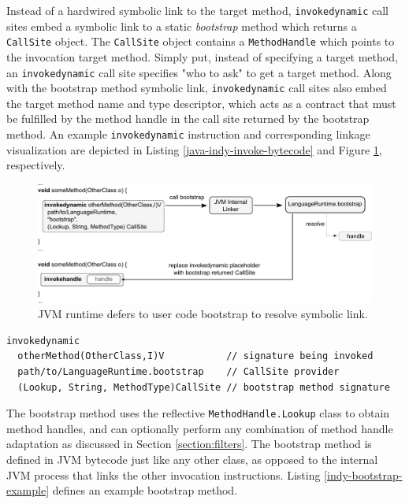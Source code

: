 Instead of a hardwired symbolic link to the target method, \texttt{invokedynamic} call sites embed a symbolic link to a static \emph{bootstrap} method which returns a \texttt{CallSite} object.  The \texttt{CallSite} object contains a \texttt{MethodHandle} which points to the invocation target method.  Simply put, instead of specifying a target method, an \texttt{invokedynamic} call site specifies "who to ask" to get a target method.  Along with the bootstrap method symbolic link, \texttt{invokedynamic} call sites also embed the target method name and type descriptor, which acts as a contract that must be fulfilled by the method handle in the call site returned by the bootstrap method.  An example \texttt{invokedynamic} instruction and corresponding linkage visualization are depicted in Listing \ref{java-indy-invoke-bytecode} and Figure \ref{fig:linking-invokedynamic}, respectively.
\vspace{2em}
\begin{figure}[htbp]
	\centering
    \includegraphics[width=\textwidth]{./Figures/linking-indy-bootstrap.pdf}
	\caption[invokedynamic Linking]{JVM runtime defers to user code bootstrap to resolve symbolic link.}
  \label{fig:linking-invokedynamic}
\end{figure}
\vspace{2em}
\begin{lstlisting}[language=jvm-bytecode,caption=dynamic invocation bytecode,label=java-indy-invoke-bytecode]
invokedynamic
  otherMethod(OtherClass,I)V           // signature being invoked
  path/to/LanguageRuntime.bootstrap    // CallSite provider
  (Lookup, String, MethodType)CallSite // bootstrap method signature
\end{lstlisting}

The bootstrap method uses the reflective \texttt{MethodHandle.Lookup} class to obtain method handles, and can optionally perform any combination of method handle adaptation as discussed in Section \ref{section:filters}.  The bootstrap method is defined in JVM bytecode just like any other class, as opposed to the internal JVM process that links the other invocation instructions.  Listing \ref{indy-bootstrap-example} defines an example bootstrap method.

